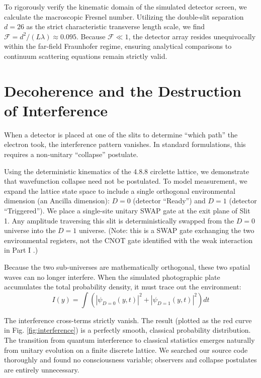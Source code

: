 \documentclass[submission, Phys]{SciPost}
\begin{document}
To rigorously verify the kinematic domain of the simulated detector screen, we calculate the macroscopic Fresnel number. Utilizing the double-slit separation $d=26$ as the strict characteristic transverse length scale, we find $\mathcal{F} = d^2 / (L\lambda) \approx 0.095$. Because $\mathcal{F} \ll 1$, the detector array resides unequivocally within the far-field Fraunhofer regime, ensuring analytical comparisons to continuum scattering equations remain strictly valid.

\section{Decoherence and the Destruction of Interference}
\label{sec:decoherence}
When a detector is placed at one of the slits to determine ``which path'' the electron took, the interference pattern vanishes. In standard formulations, this requires a non-unitary ``collapse'' postulate. 

Using the deterministic kinematics of the 4.8.8 circlette lattice, we demonstrate that wavefunction collapse need not be postulated. To model measurement, we expand the lattice state space to include a single orthogonal environmental dimension (an Ancilla dimension): $D=0$ (detector ``Ready'') and $D=1$ (detector ``Triggered''). We place a single-site unitary SWAP gate at the exit plane of Slit 1. Any amplitude traversing this slit is deterministically swapped from the $D=0$ universe into the $D=1$ universe. (Note: this is a SWAP gate exchanging the two environmental registers, not the CNOT gate identified with the weak interaction in Part I \cite{elliman2026part1}.)

Because the two sub-universes are mathematically orthogonal, these two spatial waves can no longer interfere. When the simulated photographic plate accumulates the total probability density, it must trace out the environment:
\begin{equation}
I(y) = \int \left( |\psi_{D=0}(y, t)|^2 + |\psi_{D=1}(y, t)|^2 \right) dt
\end{equation}

The interference cross-terms strictly vanish. The result (plotted as the red curve in Fig. \ref{fig:interference}) is a perfectly smooth, classical probability distribution. The transition from quantum interference to classical statistics emerges naturally from unitary evolution on a finite discrete lattice. We searched our source code thoroughly and found no consciousness variable; observers and collapse postulates are entirely unnecessary.
\end{document}
